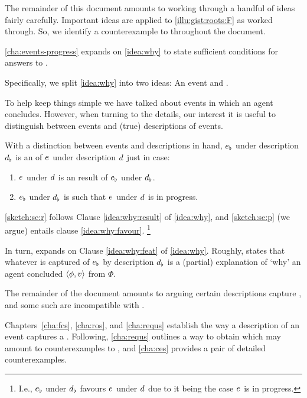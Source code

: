 \begin{note}
  The remainder of this document amounts to working through a handful of ideas fairly carefully.
  Important ideas are applied to \autoref{illu:gist:roots:F} as worked through.
  So, we identify a counterexample to \issueInclusion{} throughout the document.
\end{note}


\begin{note}
  \autoref{cha:events-progress} expands on \autoref{idea:why} to state sufficient conditions for answers to \qWhy{}.

  Specifically, we split \autoref{idea:why} into two ideas:
  An \se{} event and \progEx{}.

  To help keep things simple we have talked about events in which an agent concludes.
  However, when turning to the details, our interest it is useful to distinguish between events and (true) descriptions of events.

  With a distinction between events and descriptions in hand, \(e\sb{\flat}\) under description \(d\sb{\flat}\) is an \emph{\se{}} of \(e\sb{}\) under description \(d\sb{}\) just in case:

  \begin{enumerate}[label=\arabic*., ref=\arabic*]
  \item
    \label{sketch:se:r}
    \(e\sb{}\) under \(d\sb{}\) is an result of \(e\sb{\flat}\) under \(d\sb{\flat}\).
  \item
    \label{sketch:se:p}
    \(e\sb{\flat}\) under \(d\sb{\flat}\) is such that \(e\sb{}\) under \(d\sb{}\) is in progress.
  \end{enumerate}
  \ref{sketch:se:r} follows Clause \ref{idea:why:result} of \autoref{idea:why}, and \ref{sketch:se:p} (we argue) entails clause \ref{idea:why:favour}.%
  \footnote{
    I.e., \(e\sb{\flat}\) under \(d\sb{\flat}\) favours \(e\sb{}\) under \(d\sb{}\) due to it being the case \(e\sb{}\) is in progress.
  }

  In turn, \progEx{} expands on Clause \ref{idea:why:feat} of \autoref{idea:why}.
  Roughly, \progEx{} states that whatever is captured of \(e\sb{\flat}\) by description \(d\sb{\flat}\) is a (partial) explanation of `why' an agent concluded \(\langle\phi, v\rangle\) from \(\Phi\).

  The remainder of the document amounts to arguing certain descriptions capture , and some such  are incompatible with \issueInclusion{}.

  Chapters~\ref{cha:fcs}, \ref{cha:ros}, and \autoref{cha:requs} establish the way a description of an event captures a \fingfr{}.
  Following, \autoref{cha:requs} outlines a way to obtain  which may amount to counterexamples to \issueInclusion{}, and \autoref{cha:ces} provides a pair of detailed counterexamples.
\end{note}

